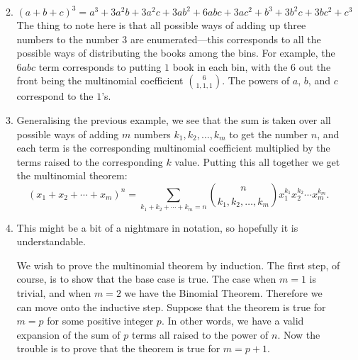 \documentclass[a4paper]{article}
\begin{document}
\begin{enumerate}
\begin{enumerate}
\[  \]
\item \[(a+b+c)^3=a^3+3a^2b+3a^2c+3ab^2+6abc+3ac^2+b^3+3b^2c+3bc^2+c^3\]
  The thing to note here is that all possible ways of adding up three numbers to the number \(3\) are enumerated---this corresponds to all the possible
  ways of distributing the books among the bins. For example, the \(6abc\) term corresponds to putting \(1\) book in each bin, with the \(6\) out
  the front being the multinomial coefficient \(\binom{6}{1,1,1}.\) The powers of \(a\), \(b\), and \(c\) correspond to the \(1\)'s.
\item Generalising the previous example, we see that the sum is taken over all possible ways of adding \(m\) numbers \(k_1,k_2,\ldots,k_m\)
  to get the number \(n\), and each term is the corresponding multinomial coefficient multiplied by the terms raised to the corresponding \(k\) value.
  Putting this all together we get the multinomial theorem:
  \[(x_1+x_2+\cdots+x_m)^n=\sum_{k_1+k_2+\cdots+k_m=n}\binom{n}{k_1,k_2,\ldots,k_m}x_1^{k_1}x_2^{k_2}\cdots x_m^{k_m}.
    \]
  \item This might be a bit of a nightmare in notation, so hopefully it is understandable.

    We wish to prove the multinomial theorem by induction. The first step, of course, is to show that the base case is true. The case when \(m=1\)
    is trivial, and when \(m=2\) we have the Binomial Theorem. Therefore we can move onto the inductive step. Suppose that the theorem is true
    for \(m=p\) for some positive integer \(p\). In other words, we have a valid expansion of the sum of \(p\) terms all raised to the power of \(n\).
    Now the trouble is to prove that the theorem is true for \(m=p+1\).


\end{enumerate}
\end{enumerate}
\end{document}
